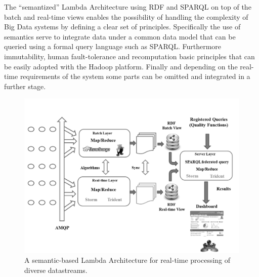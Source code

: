 The ``semantized'' Lambda Architecture using RDF and SPARQL on top of the batch and real-time views enables 
the possibility of handling the complexity of Big Data systems by defining a clear set of principles. Specifically 
the use of semantics serve to integrate data under a common data model that can be queried using a formal 
query language such as SPARQL. Furthermore immutability, human fault-tolerance and recomputation basic principles 
that can be easily adopted with the Hadoop platform. Finally and depending on the real-time requirements of 
the system some parts can be omitted and integrated in a further stage.

\begin{figure}[!ht]
\centering
	\includegraphics[width=12cm]{./imgs/lambda-qos}
 \caption{A semantic-based Lambda Architecture for real-time processing of diverse datastreams.}
 \label{fig:lambda-qos}
\end{figure}

